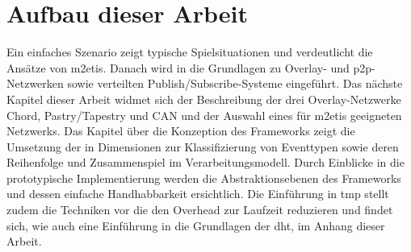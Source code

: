 \section*{Aufbau dieser Arbeit}
Ein einfaches Szenario zeigt typische Spielsituationen und verdeutlicht die Ansätze von \ac{m2etis}. Danach wird in die Grundlagen zu Overlay- und p2p-Netzwerken sowie verteilten Publish/Subscribe-Systeme eingeführt. Das nächste Kapitel dieser Arbeit widmet sich der Beschreibung der drei Overlay-Netzwerke Chord, Pastry/Tapestry und CAN und der Auswahl eines für \ac{m2etis} geeigneten Netzwerks. Das Kapitel über die Konzeption des Frameworks zeigt die Umsetzung der in  Dimensionen zur Klassifizierung von Eventtypen sowie deren Reihenfolge und Zusammenspiel im Verarbeitungsmodell. Durch Einblicke in die prototypische Implementierung werden die Abstraktionsebenen des Frameworks und dessen einfache Handhabbarkeit ersichtlich. Die Einführung in \ac{tmp} stellt zudem die Techniken vor die den Overhead zur Laufzeit reduzieren und findet sich, wie auch eine Einführung in die Grundlagen der \ac{dht}, im Anhang dieser Arbeit.
